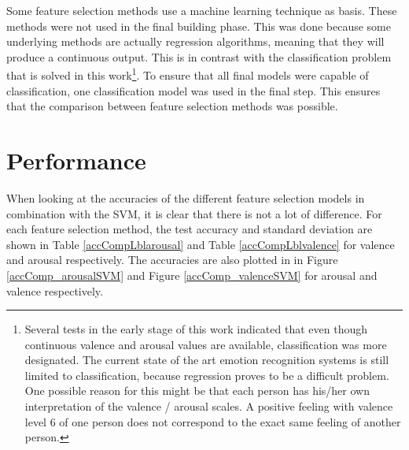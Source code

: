 Some feature selection methods use a machine learning technique as basis. These methods were not used in the final building phase. This was done because some underlying methods are actually regression algorithms, meaning that they will produce a continuous output. This is in contrast with the classification problem that is solved in this work\footnote{Several tests in the early stage of this work indicated that even though continuous valence and arousal values are available, classification was more designated. The current state of the art emotion recognition systems is still limited to classification, because regression proves to be a difficult problem. One possible reason for this might be that each person has his/her own interpretation of the valence / arousal scales. A positive feeling with valence level 6 of one person does not correspond to the exact same feeling of another person.}. To ensure that all final models were capable of classification, one classification model was used in the final step. This ensures that the comparison between feature selection methods was possible.

\section{Performance}

When looking at the accuracies of the different feature selection models in combination with the SVM, it is clear that there is not a lot of difference. For each feature selection method, the test accuracy and standard deviation are shown in Table \ref{accCompLblarousal} and Table \ref{accCompLblvalence} for valence and arousal respectively. The accuracies are also plotted in in Figure \ref{accComp_arousalSVM} and Figure \ref{accComp_valenceSVM} for arousal and valence respectively.


